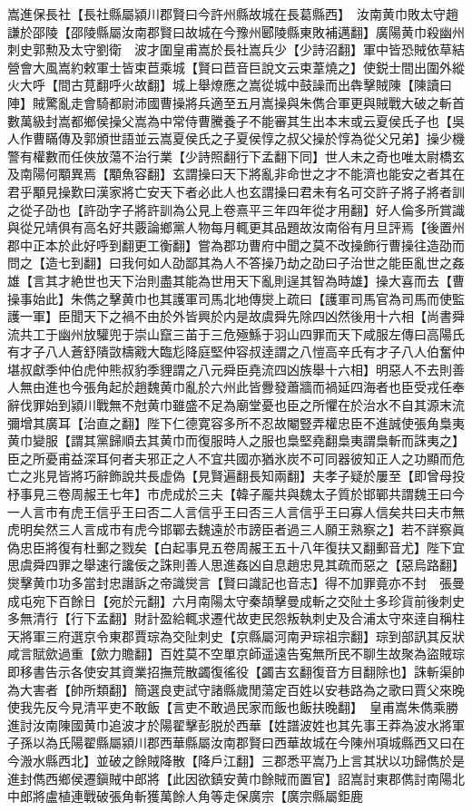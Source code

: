嵩進保長社【長社縣屬潁川郡賢曰今許州縣故城在長葛縣西】　汝南黄巾敗太守趙謙於邵陵【邵陵縣屬汝南郡賢曰故城在今豫州郾陵縣東敗補邁翻】廣陽黄巾殺幽州刺史郭勲及太守劉衛　波才圍皇甫嵩於長社嵩兵少【少詩沼翻】軍中皆恐賊依草結營會大風嵩約敕軍士皆束苣乘城【賢曰苣音巨說文云束葦燒之】使鋭士間出圍外縱火大呼【間古莧翻呼火故翻】城上舉燎應之嵩從城中鼓譟而出犇擊賊陳【陳讀曰陣】賊驚亂走會騎都尉沛國曹操將兵適至五月嵩操與朱儁合軍更與賊戰大破之斬首數萬級封嵩都鄉侯操父嵩為中常侍曹騰養子不能審其生出本末或云夏侯氏子也【吳人作曹瞞傳及郭頒世語並云嵩夏侯氏之子夏侯惇之叔父操於惇為從父兄弟】操少機警有權數而任俠放蕩不治行業【少詩照翻行下孟翻下同】世人未之奇也唯太尉橋玄及南陽何顒異焉【顒魚容翻】玄謂操曰天下將亂非命世之才不能濟也能安之者其在君乎顒見操歎曰漢家將亡安天下者必此人也玄謂操曰君未有名可交許子將子將者訓之從子劭也【許劭字子將許訓為公見上卷熹平三年四年從才用翻】好人倫多所賞識與從兄靖俱有高名好共覈論鄉黨人物每月輒更其品題故汝南俗有月旦評焉【後置州郡中正本於此好呼到翻更工衡翻】嘗為郡功曹府中聞之莫不改操飾行曹操往造劭而問之【造七到翻】曰我何如人劭鄙其為人不答操乃劫之劭曰子治世之能臣亂世之姦雄【言其才絶世也天下治則盡其能為世用天下亂則逞其智為時雄】操大喜而去【曹操事始此】朱儁之擊黄巾也其護軍司馬北地傳爕上疏曰【護軍司馬官為司馬而使監護一軍】臣聞天下之禍不由於外皆興於内是故虞舜先除四凶然後用十六相【尚書舜流共工于幽州放驩兜于崇山竄三苖于三危殛鯀于羽山四罪而天下咸服左傳曰高陽氏有才子八人蒼舒隤敳檮戭大臨尨降庭堅仲容叔逹謂之八愷高辛氏有才子八人伯奮仲堪叔獻季仲伯虎仲熊叔豹季貍謂之八元舜臣堯流四凶族舉十六相】明惡人不去則善人無由進也今張角起於趙魏黄巾亂於六州此皆釁發蕭牆而禍延四海者也臣受戎任奉辭伐罪始到潁川戰無不尅黄巾雖盛不足為廟堂憂也臣之所懼在於治水不自其源末流彌增其廣耳【治直之翻】陛下仁德寛容多所不忍故閹豎弄權忠臣不進誠使張角梟夷黄巾變服【謂其黨歸順去其黄巾而復服時人之服也梟堅堯翻梟夷謂梟斬而誅夷之】臣之所憂甫益深耳何者夫邪正之人不宜共國亦猶氷炭不可同器彼知正人之功顯而危亡之兆見皆將巧辭飾說共長虚偽【見賢遍翻長知兩翻】夫孝子疑於屢至【即曾母投杼事見三卷周赧王七年】市虎成於三夫【韓子龎共與魏太子質於邯鄲共謂魏王曰今一人言市有虎王信乎王曰否二人言信乎王曰否三人言信乎王曰寡人信矣共曰夫市無虎明矣然三人言成市有虎今邯鄲去魏遠於市謗臣者過三人願王熟察之】若不詳察眞偽忠臣將復有杜郵之戮矣【白起事見五卷周赧王五十八年復扶又翻郵音尤】陛下宜思虞舜四罪之舉速行讒佞之誅則善人思進姦凶自息趙忠見其疏而惡之【惡烏路翻】爕擊黄巾功多當封忠譖訴之帝識爕言【賢曰識記也音志】得不加罪竟亦不封　張曼成屯宛下百餘日【宛於元翻】六月南陽太守秦頡擊曼成斬之交阯土多珍貨前後刺史多無清行【行下孟翻】財計盈給輒求遷代故吏民怨叛執刺史及合浦太守來逹自稱柱天將軍三府選京令東郡賈琮為交阯刺史【京縣屬河南尹琮祖宗翻】琮到部訊其反狀咸言賦歛過重【歛力贍翻】百姓莫不空單京師遥遠告寃無所民不聊生故聚為盜賊琮即移書告示各使安其資業招撫荒散蠲復徭役【蠲吉玄翻復音方目翻除也】誅斬渠帥為大害者【帥所類翻】簡選良吏試守諸縣歲閒蕩定百姓以安巷路為之歌曰賈父來晚使我先反今見清平吏不敢飯【言吏不敢過民家而飯也飯扶晚翻】　皇甫嵩朱儁乘勝進討汝南陳國黄巾追波才於陽翟擊彭脱於西華【姓譜波姓也其先事王莽為波水將軍子孫以為氏陽翟縣屬潁川郡西華縣屬汝南郡賢曰西華故城在今陳州項城縣西又曰在今溵水縣西北】並破之餘賊降散【降戶江翻】三郡悉平嵩乃上言其狀以功歸儁於是進封儁西鄉侯遷鎭賊中郎將【此因欲鎮安黄巾餘賊而置官】詔嵩討東郡儁討南陽北中郎將盧植連戰破張角斬獲萬餘人角等走保廣宗【廣宗縣屬鉅鹿